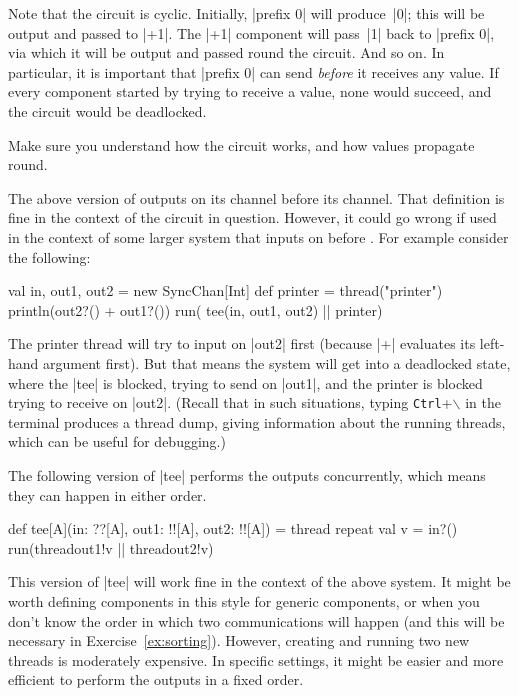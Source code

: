 Note that the circuit is cyclic.  Initially, |prefix 0| will produce~|0|; this
will be output and passed to |+1|.  The |+1| component will pass~|1| back to
|prefix 0|, via which it will be output and passed round the circuit.  And so
on.  In particular, it is important that |prefix 0| can send \emph{before} it
receives any value.  If every component started by trying to receive a value,
none would succeed, and the circuit would be deadlocked. 

\begin{instruction}
Make sure you understand how the circuit works, and how values propagate
round.
\end{instruction}

The above version of  outputs on its  channel before
its  channel.  That definition is fine in the context of the
circuit in question.  However, it could go wrong if used in the context of
some larger system that inputs on  before .  For
example consider the following:
%
\begin{scala}
  val in, out1, out2 = new SyncChan[Int]
  def printer = thread("printer"){ println(out2?() + out1?()) } 
  run( tee(in, out1, out2) || printer)
\end{scala}
%
The printer thread will try to input on |out2| first (because |+| evaluates
its left-hand argument first).  But that means the system will get into a
deadlocked state, where the |tee| is blocked, trying to send on |out1|, and
the printer is blocked trying to receive on |out2|.  (Recall that in such
situations, typing \texttt{Ctrl}+$\backslash$ in the terminal produces a
thread dump, giving information about the running threads, which can be useful
for debugging.)


The following version of |tee| performs the outputs concurrently, which means
they can happen in either order.
%
\begin{mysamepage}
\begin{scala}
  def tee[A](in: ??[A], out1: !![A], out2: !![A]) = thread{
    repeat{ 
      val v = in?()
      run(thread{out1!v} || thread{out2!v}) 
    }
  }
\end{scala}
\end{mysamepage}
%
This version of |tee| will work fine in the context of the above system.  It
might be worth defining components in this style for generic components, or
when you don't know the order in which two communications will happen (and
this will be necessary in Exercise~\ref{ex:sorting}).  However, creating and
running two new threads is moderately expensive.  In specific settings, it
might be easier and more efficient to perform the outputs in a fixed order.
